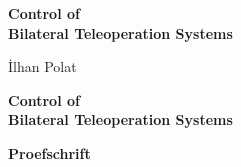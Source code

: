 
\newcommand{\thetitle}{Control of \\[2mm] Bilateral Teleoperation Systems}
\newcommand{\thesubtitle}{}
\renewcommand{\theauthor}{\.Ilhan Polat}
\pagestyle{phdstayla} %
\vspace*{30mm}

\thispagestyle{empty}
\begin{center}
    \textbf{\huge \thetitle}\\[\baselineskip]\textbf{\LARGE \thesubtitle}
\end{center}

\vspace{20mm}
\begin{center}
    \Large\theauthor
\end{center}
\newpage

\thispagestyle{empty}

%
\vspace*{\fill}{\tiny .}
%
\newpage
\thispagestyle{empty}
\vspace*{30mm}

\begin{center}
     \textbf{\huge \thetitle}
\end{center}

\vspace{30mm}

\begin{center}
    \textbf{Proefschrift}
\end{center}

